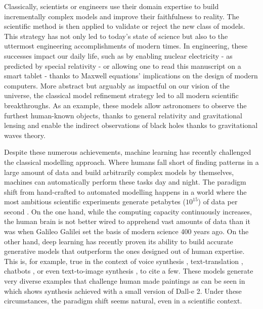 Classically, scientists or engineers use their domain expertise to build incrementally complex models and improve their faithfulness to reality. The scientific method is then applied to validate or reject the new class of models. This strategy has not only led to today's state of science but also to the uttermost engineering accomplishments of modern times. In engineering, these successes impact our daily life, such as by enabling nuclear electricity - as predicted by special relativity - or allowing one to read this manuscript on a smart tablet - thanks to Maxwell equations' implications on the design of modern computers. More abstract but arguably as impactful on our vision of the universe, the classical model refinement strategy led to all modern scientific breakthroughs. As an example, these models allow astronomers to observe the furthest human-known objects, thanks to general relativity and gravitational lensing and enable the indirect observations of black holes thanks to gravitational waves theory.

Despite these numerous achievements, machine learning has recently challenged the classical modelling approach. Where humans fall short of finding patterns in a large amount of data and build arbitrarily complex models by themselves, machines can automatically perform these tasks day and night. The paradigm shift from hand-crafted to automated modelling happens in a world where the most ambitious scientific experiments generate petabytes ($10^{15}$) of data per second \citep{noauthor_cern_nodate}. On the one hand, while the computing capacity continuously increases, the human brain is not better wired to apprehend vast amounts of data than it was when Galileo Galilei set the basis of modern science 400 years ago. On the other hand, deep learning has recently proven its ability to build accurate generative models that outperform the ones designed out of human expertise. This is, for example, true in the context of voice synthesis \citep{van_den_oord_wavenet_2016}, text-translation \citep{brown2020language, devlin2018bert}, chatbots \citep{alayrac2022flamingo}, or even text-to-image synthesis \citep{ramesh2022hierarchical, saharia2022photorealistic}, to cite a few. These models generate very diverse examples that challenge human made paintings as can be seen in  which shows synthesis achieved with a small version of Dall-e 2. Under these circumstances, the paradigm shift seems natural, even in a scientific context.

